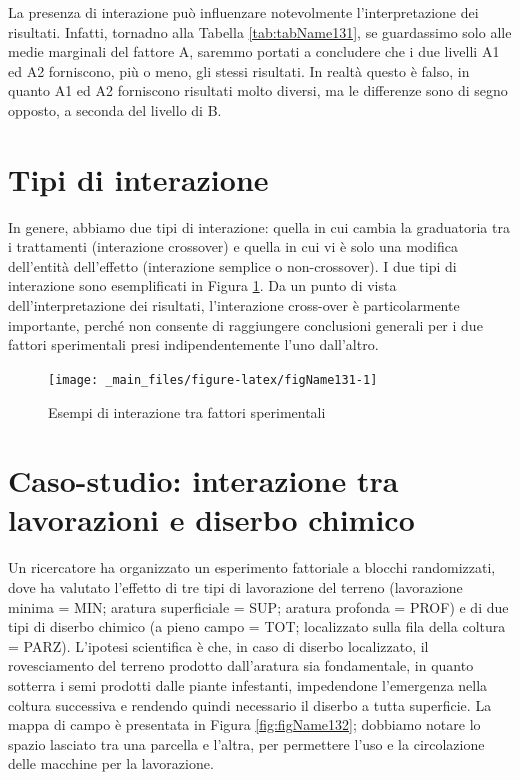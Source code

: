 \documentclass[a4paper,12pt,oneside]{book}
\begin{document}
La presenza di interazione può influenzare notevolmente l'interpretazione dei risultati. Infatti, tornadno alla Tabella \ref{tab:tabName131}, se guardassimo solo alle medie marginali del fattore A, saremmo portati a concludere che i due livelli A1 ed A2 forniscono, più o meno, gli stessi risultati. In realtà questo è falso, in quanto A1 ed A2 forniscono risultati molto diversi, ma le differenze sono di segno opposto, a seconda del livello di B.

\hypertarget{tipi-di-interazione}{%
\section{Tipi di interazione}\label{tipi-di-interazione}}

In genere, abbiamo due tipi di interazione: quella in cui cambia la graduatoria tra i trattamenti (interazione crossover) e quella in cui vi è solo una modifica dell'entità dell'effetto (interazione semplice o non-crossover). I due tipi di interazione sono esemplificati in Figura \ref{fig:figName131}. Da un punto di vista dell'interpretazione dei risultati, l'interazione cross-over è particolarmente importante, perché non consente di raggiungere conclusioni generali per i due fattori sperimentali presi indipendentemente l'uno dall'altro.

\begin{figure}

{\centering \texttt{[image: \_main\_files/figure-latex/figName131-1]} 

}

\caption{Esempi di interazione tra fattori sperimentali}\label{fig:figName131}
\end{figure}

\hypertarget{caso-studio-interazione-tra-lavorazioni-e-diserbo-chimico}{%
\section{Caso-studio: interazione tra lavorazioni e diserbo chimico}\label{caso-studio-interazione-tra-lavorazioni-e-diserbo-chimico}}

Un ricercatore ha organizzato un esperimento fattoriale a blocchi randomizzati, dove ha valutato l'effetto di tre tipi di lavorazione del terreno (lavorazione minima = MIN; aratura superficiale = SUP; aratura profonda = PROF) e di due tipi di diserbo chimico (a pieno campo = TOT; localizzato sulla fila della coltura = PARZ). L'ipotesi scientifica è che, in caso di diserbo localizzato, il rovesciamento del terreno prodotto dall'aratura sia fondamentale, in quanto sotterra i semi prodotti dalle piante infestanti, impedendone l'emergenza nella coltura successiva e rendendo quindi necessario il diserbo a tutta superficie. La mappa di campo è presentata in Figura \ref{fig:figName132}; dobbiamo notare lo spazio lasciato tra una parcella e l'altra, per permettere l'uso e la circolazione delle macchine per la lavorazione.
\end{document}
